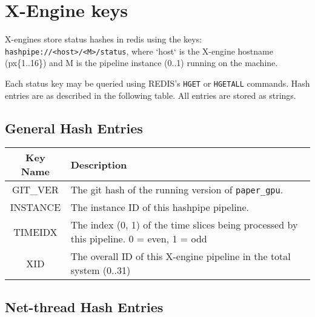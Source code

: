 \documentclass{article}
\begin{document}
\section{X-Engine keys}

X-engines store status hashes in redis using the keys: \texttt{hashpipe://<host>/<M>/status}, where `host` is the X-engine hostname (px\{1..16\}) and M is the pipeline instance (0..1) running on the machine.

Each status key may be queried using REDIS's \texttt{HGET} or \texttt{HGETALL} commands. Hash entries are as described in the following table. All entries are stored as strings.
\\
\subsection{General Hash Entries}

\begin{centering}
\begin{tabular}{c p{}}
\hline
Key Name & Description \\
\hline
\hline
GIT\_VER & The git hash of the running version of \texttt{paper\_gpu}. \\
INSTANCE & The instance ID of this hashpipe pipeline. \\
TIMEIDX  & The index (0, 1) of the time slices being processed by this pipeline. 0 = even, 1 = odd \\
XID      & The overall ID of this X-engine pipeline in the total system (0..31) \\
\end{tabular}
\end{centering}

\subsection{Net-thread Hash Entries}
\end{document}

